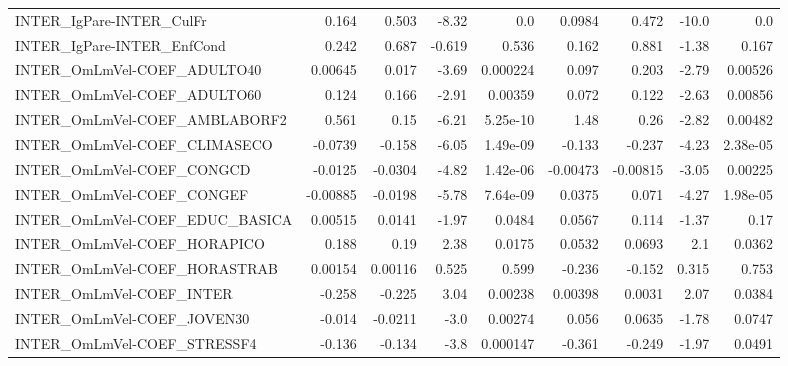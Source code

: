 \begin{tabular}{lrrrrrrrr}
INTER\_IgPare-INTER\_CulFr              &       0.164 &        0.503 &    -8.32 &      0.0 &     0.0984 &       0.472 &        -10.0 &           0.0 \\
INTER\_IgPare-INTER\_EnfCond            &       0.242 &        0.687 &   -0.619 &    0.536 &      0.162 &       0.881 &        -1.38 &         0.167 \\
INTER\_OmLmVel-COEF\_ADULTO40           &     0.00645 &        0.017 &    -3.69 & 0.000224 &      0.097 &       0.203 &        -2.79 &       0.00526 \\
INTER\_OmLmVel-COEF\_ADULTO60           &       0.124 &        0.166 &    -2.91 &  0.00359 &      0.072 &       0.122 &        -2.63 &       0.00856 \\
INTER\_OmLmVel-COEF\_AMBLABORF2         &       0.561 &         0.15 &    -6.21 & 5.25e-10 &       1.48 &        0.26 &        -2.82 &       0.00482 \\
INTER\_OmLmVel-COEF\_CLIMASECO          &     -0.0739 &       -0.158 &    -6.05 & 1.49e-09 &     -0.133 &      -0.237 &        -4.23 &      2.38e-05 \\
INTER\_OmLmVel-COEF\_CONGCD             &     -0.0125 &      -0.0304 &    -4.82 & 1.42e-06 &   -0.00473 &    -0.00815 &        -3.05 &       0.00225 \\
INTER\_OmLmVel-COEF\_CONGEF             &    -0.00885 &      -0.0198 &    -5.78 & 7.64e-09 &     0.0375 &       0.071 &        -4.27 &      1.98e-05 \\
INTER\_OmLmVel-COEF\_EDUC\_BASICA        &     0.00515 &       0.0141 &    -1.97 &   0.0484 &     0.0567 &       0.114 &        -1.37 &          0.17 \\
INTER\_OmLmVel-COEF\_HORAPICO           &       0.188 &         0.19 &     2.38 &   0.0175 &     0.0532 &      0.0693 &          2.1 &        0.0362 \\
INTER\_OmLmVel-COEF\_HORASTRAB          &     0.00154 &      0.00116 &    0.525 &    0.599 &     -0.236 &      -0.152 &        0.315 &         0.753 \\
INTER\_OmLmVel-COEF\_INTER              &      -0.258 &       -0.225 &     3.04 &  0.00238 &    0.00398 &      0.0031 &         2.07 &        0.0384 \\
INTER\_OmLmVel-COEF\_JOVEN30            &      -0.014 &      -0.0211 &     -3.0 &  0.00274 &      0.056 &      0.0635 &        -1.78 &        0.0747 \\
INTER\_OmLmVel-COEF\_STRESSF4           &      -0.136 &       -0.134 &     -3.8 & 0.000147 &     -0.361 &      -0.249 &        -1.97 &        0.0491 \\

\end{tabular}
